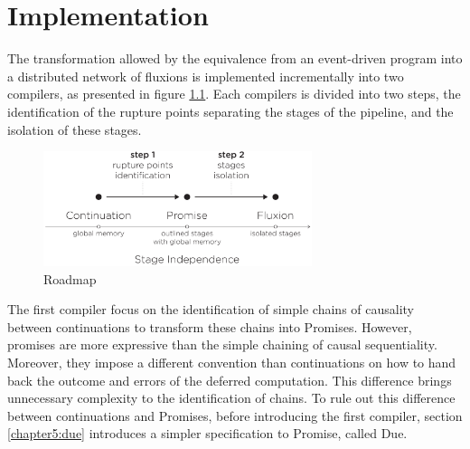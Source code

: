 \chapter{Implementation} \label{chapter5}
\minitoc
\eject
The transformation allowed by the equivalence from an event-driven program into a distributed network of fluxions is implemented incrementally into two compilers, as presented in figure \ref{fig:roadmap}.
Each compilers is divided into two steps, the identification of the rupture points separating the stages of the pipeline, and the isolation of these stages.

\begin{figure}[h!]
\begin{center}
\includegraphics[width=0.7\textwidth]{../resources/roadmap.pdf}
\end{center}
\caption{Roadmap}
\label{fig:roadmap}
\end{figure}

The first compiler focus on the identification of simple chains of causality between continuations to transform these chains into Promises.
However, promises are more expressive than the simple chaining of causal sequentiality.
Moreover, they impose a different convention than continuations on how to hand back the outcome and errors of the deferred computation.
This difference brings unnecessary complexity to the identification of chains.
To rule out this difference between continuations and Promises, before introducing the first compiler, section \ref{chapter5:due} introduces a simpler specification to Promise, called Due.

